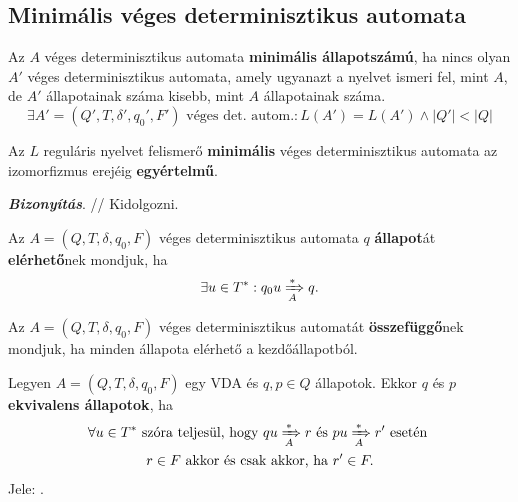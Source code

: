 \subsection{Minimális véges determinisztikus automata}

\begin{tcolorbox}
	\begin{definition}
		Az $A$ véges determinisztikus automata \textbf{minimális állapotszámú},
		ha nincs olyan $A'$ véges determinisztikus automata, amely
		ugyanazt a nyelvet ismeri fel, mint $A$, de $A'$ állapotainak száma
		kisebb, mint $A$ állapotainak száma.
		\[ \exists A'=(Q', T, \delta', q_0', F') \text{ véges det. autom.} : L(A') = L(A') \land |Q'| < |Q| \]
	\end{definition}
\end{tcolorbox}

\begin{tcolorbox}
	\begin{theorem}
		Az $L$ reguláris nyelvet felismerő \textbf{minimális} véges determinisztikus automata az izomorfizmus erejéig \textbf{egyértelmű}.
	\end{theorem}
\end{tcolorbox}

\textbf{\textit{Bizonyítás}}. // Kidolgozni.

\begin{tcolorbox}
	\begin{definition}
		Az $A = (Q, T, \delta,q_0, F)$ véges determinisztikus automata
		$q$ \textbf{állapot}át \textbf{elérhető}nek mondjuk,
		ha \[ \exists u \in T^* : q_0 u \xRightarrow[{A}]{*} q. \]
	\end{definition}
\end{tcolorbox}

\begin{tcolorbox}
	\begin{definition}
		Az $A = (Q, T, \delta,q_0, F)$ véges determinisztikus automatát
		\textbf{összefüggő}nek mondjuk, ha minden állapota elérhető a
		kezdőállapotból.
	\end{definition}
\end{tcolorbox}

\begin{tcolorbox}
	\begin{definition}
		Legyen $A = (Q, T, \delta,q_0, F)$ egy VDA és $q, p \in Q$ állapotok.
		Ekkor $q$ és $p$ \textbf{ekvivalens állapotok},
		ha
		\begin{gather*}
			\forall u \in T^* \text{ szóra teljesül, hogy } qu \xRightarrow[{A}]{*} r \text{ és } pu \xRightarrow[{A}]{*} r' \text{ esetén } \\
			r \in F \text{ akkor és csak akkor, ha } r' \in F.
		\end{gather*}
		Jele:  .
	\end{definition}
\end{tcolorbox}

